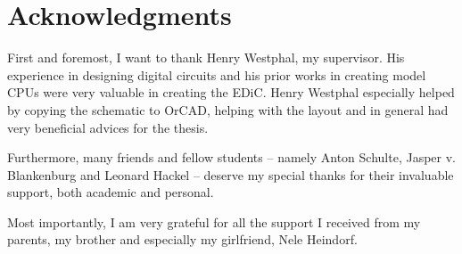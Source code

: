 \chapter*{Acknowledgments}
First and foremost, I want to thank Henry Westphal, my supervisor.
His experience in designing digital circuits and his prior works in creating model \glspl{CPU} were very valuable in creating the \gls{EDiC}.
Henry Westphal especially helped by copying the schematic to OrCAD, helping with the layout and in general had very beneficial advices for the thesis.

Furthermore, many friends and fellow students -- namely Anton Schulte, Jasper v. Blankenburg and Leonard Hackel -- deserve my special thanks for their invaluable support, both academic and personal.

Most importantly, I am very grateful for all the support I received from my parents, my brother and especially my girlfriend, Nele Heindorf.